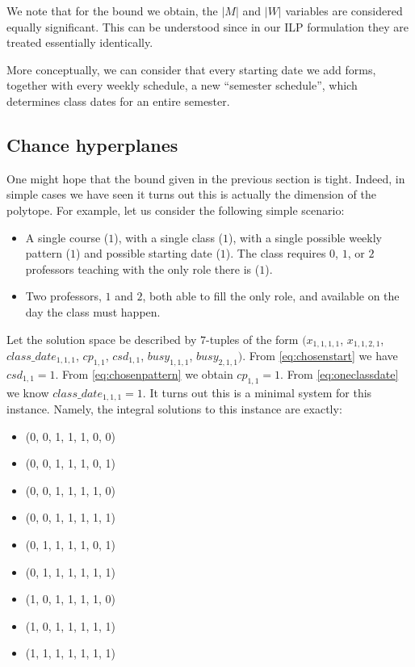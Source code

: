 We note that for the bound we obtain, the $|M|$ and $|W|$ variables are considered equally significant. This can be understood since in our ILP formulation they are treated essentially identically.

More conceptually, we can consider that every starting date we add forms, together with every weekly schedule, a new ``semester schedule'', which determines class dates for an entire semester.

\subsection{Chance hyperplanes}

One might hope that the bound given in the previous section is tight. Indeed, in simple cases we have seen it turns out this is actually the dimension of the polytope. For example, let us consider the following simple scenario:

\begin{itemize}
  \item A single course ($1$), with a single class ($1$), with a single possible weekly pattern ($1$) and possible starting date ($1$). The class requires $0$, $1$, or $2$ professors teaching with the only role there is ($1$).
  \item Two professors, $1$ and $2$, both able to fill the only role, and available on the day the class must happen.
\end{itemize}

Let the solution space be described by $7$-tuples of the form $(x_{1, 1, 1, 1}$, $x_{1, 1, 2, 1}$, $class\_date_{1, 1, 1}$, $cp_{1, 1}$, $csd_{1, 1}$, $busy_{1, 1, 1}$, $busy_{2, 1, 1})$. From \ref{eq:chosenstart} we have $csd_{1, 1} = 1$. From \ref{eq:chosenpattern} we obtain $cp_{1, 1} = 1$. From \ref{eq:oneclassdate} we know $class\_date_{1, 1, 1} = 1$. It turns out this is a minimal system for this instance. Namely, the integral solutions to this instance are exactly:

\begin{itemize}
\item (0, 0, 1, 1, 1, 0, 0)
\item (0, 0, 1, 1, 1, 0, 1)
\item (0, 0, 1, 1, 1, 1, 0)
\item (0, 0, 1, 1, 1, 1, 1)
\item (0, 1, 1, 1, 1, 0, 1)
\item (0, 1, 1, 1, 1, 1, 1)
\item (1, 0, 1, 1, 1, 1, 0)
\item (1, 0, 1, 1, 1, 1, 1)
\item (1, 1, 1, 1, 1, 1, 1)
\end{itemize}

